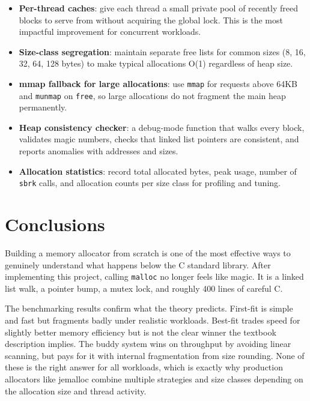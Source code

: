 \documentclass[12pt, a4paper]{report}
\begin{document}
\begin{itemize}
  \item \textbf{Per-thread caches}: give each thread a small private pool of
    recently freed blocks to serve from without acquiring the global lock. This
    is the most impactful improvement for concurrent workloads.

  \item \textbf{Size-class segregation}: maintain separate free lists for
    common sizes (8, 16, 32, 64, 128 bytes) to make typical allocations O(1)
    regardless of heap size.

  \item \textbf{mmap fallback for large allocations}: use \texttt{mmap} for
    requests above 64KB and \texttt{munmap} on \texttt{free}, so large
    allocations do not fragment the main heap permanently.

  \item \textbf{Heap consistency checker}: a debug-mode function that walks
    every block, validates magic numbers, checks that linked list pointers are
    consistent, and reports anomalies with addresses and sizes.

  \item \textbf{Allocation statistics}: record total allocated bytes, peak
    usage, number of \texttt{sbrk} calls, and allocation counts per size class
    for profiling and tuning.
\end{itemize}

\chapter{Conclusions}

Building a memory allocator from scratch is one of the most effective ways to
genuinely understand what happens below the C standard library. After
implementing this project, calling \texttt{malloc} no longer feels like magic.
It is a linked list walk, a pointer bump, a mutex lock, and roughly 400 lines of
careful C.

The benchmarking results confirm what the theory predicts. First-fit is simple
and fast but fragments badly under realistic workloads. Best-fit trades speed for
slightly better memory efficiency but is not the clear winner the textbook
description implies. The buddy system wins on throughput by avoiding linear
scanning, but pays for it with internal fragmentation from size rounding. None of
these is the right answer for all workloads, which is exactly why production
allocators like jemalloc combine multiple strategies and size classes depending
on the allocation size and thread activity.
\end{document}
